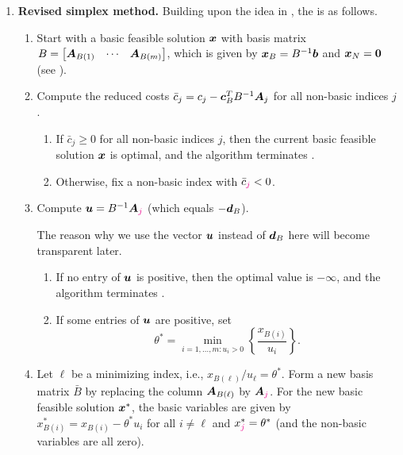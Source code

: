 \begin{enumerate}
\item\label{it:revised-simplex-algo} \textbf{Revised simplex method.} Building upon the idea in
, the  is
as follows.
\begin{enumerate}[label={(\arabic*)}]
\item Start with a basic feasible solution \(\bm{x}\) with basis matrix \(B=\begin{bmatrix}
\bm{A}_{B(1)}&\cdots&\bm{A}_{B(m)}\end{bmatrix}\), which is given by
\(\bm{x}_{B}=B^{-1}\bm{b}\) and \(\bm{x}_N=\bm{0}\) (see
). 
\item Compute the reduced costs
\(\bar{c}_j=c_j-\bm{c}_{B}^{T}B^{-1}\bm{A}_j\) for all non-basic indices
\(j\).
\begin{enumerate}
\item If \(\bar{c}_j\ge 0\) for all non-basic indices \(j\), then the current
basic feasible solution \(\bm{x}\) is optimal, and the algorithm terminates
.
\item Otherwise, fix a non-basic index  with \(\bar{c}_{\mgc{j}}<0\).
\end{enumerate}
\item Compute \(\vect{u}=B^{-1}\vect{A}_{\mgc{j}}\) (which equals
\(-\bm{d}_{B}\)). \begin{note}
The reason why we use the vector \(\bm{u}\) instead of \(\bm{d}_{B}\) here will become transparent later.
\end{note}
\begin{enumerate}
\item If no entry of \(\bm{u}\) is positive, then the optimal value is
\(-\infty\), and the algorithm terminates .
\item If some entries of \(\bm{u}\) are positive, set
\[
\theta^{*}=\min_{i=1,\dotsc,m:u_i>0}\left\{\frac{x_{B(i)}}{u_i}\right\}.
\]
\end{enumerate}
\item Let \(\ell\) be a minimizing index, i.e.,
\(x_{B(\ell)}/u_{\ell}=\theta^{*}\). Form a new basis matrix \(\bar{B}\) by
replacing the column \(\bm{A}_{B(\ell)}\) by \(\vect{A}_{\mgc{j}}\). For the new
basic feasible solution \(\bm{x}^*\), the basic variables are given by
\(x_{B(i)}^{*}=x_{B(i)}-\theta^{*}u_i\) for all \(i\ne\ell\) and
\(x_{\mgc{j}}^{*}=\theta^{*}\) (and the non-basic variables are all zero).


\end{enumerate}
\end{enumerate}
